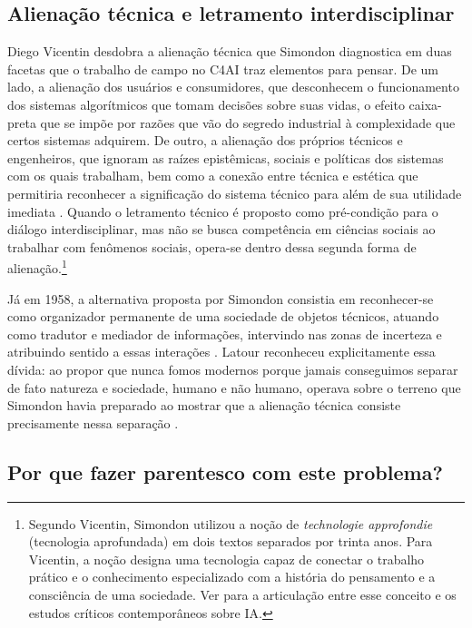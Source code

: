 \subsection*{Alienação técnica e letramento interdisciplinar}

Diego Vicentin desdobra a alienação técnica que Simondon diagnostica em duas facetas que o trabalho de campo no C4AI traz elementos para pensar. De um lado, a alienação dos usuários e consumidores, que desconhecem o funcionamento dos sistemas algorítmicos que tomam decisões sobre suas vidas, o efeito caixa-preta que se impõe por razões que vão do segredo industrial à complexidade que certos sistemas adquirem. De outro, a alienação dos próprios técnicos e engenheiros, que ignoram as raízes epistêmicas, sociais e políticas dos sistemas com os quais trabalham, bem como a conexão entre técnica e estética que permitiria reconhecer a significação do sistema técnico para além de sua utilidade imediata \parencite{Vicentin_2022_Esboco}. Quando o letramento técnico é proposto como pré-condição para o diálogo interdisciplinar, mas não se busca competência em ciências sociais ao trabalhar com fenômenos sociais, opera-se dentro dessa segunda forma de alienação.\footnote{Segundo Vicentin, Simondon utilizou a noção de \textit{technologie approfondie} (tecnologia aprofundada) em dois textos separados por trinta anos. Para Vicentin, a noção designa uma tecnologia capaz de conectar o trabalho prático e o conhecimento especializado com a história do pensamento e a consciência de uma sociedade. Ver \textcite{Vicentin_2022_Esboco} para a articulação entre esse conceito e os estudos críticos contemporâneos sobre IA.}

Já em 1958, a alternativa proposta por Simondon consistia em reconhecer-se como organizador permanente de uma sociedade de objetos técnicos, atuando como tradutor e mediador de informações, intervindo nas zonas de incerteza e atribuindo sentido a essas interações \parencite{Simondon2017OMET}. Latour reconheceu explicitamente essa dívida: ao propor que nunca fomos modernos porque jamais conseguimos separar de fato natureza e sociedade, humano e não humano, operava sobre o terreno que Simondon havia preparado ao mostrar que a alienação técnica consiste precisamente nessa separação \parencite{Latour1994Jamais}.

\subsection{Por que fazer parentesco com este problema?}

